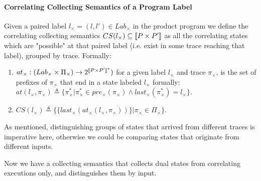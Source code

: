 \paragraph{Correlating Collecting Semantics of a Program Label} 
Given a paired label $l_{\times} = (l,l') \in Lab_{\times}$ in the product program we define the correlating collecting semantics $CS(l_{\times}) \subseteq \lbrack\!\lbrack P \times P' \rbrack\!\rbrack$ as all the correlating states which are "possible" at that paired label (i.e. exist in some trace reaching that label), grouped by trace. Formally:
\begin{enumerate}
\item $at_{\times} : (Lab_{\times} \times \Pi_{\times}) \rightarrow 2^{\lbrack\!\lbrack P \times P' \rbrack\!\rbrack^*})$ for a given label $l_{\times}$ and trace $\pi_{\times}$, is the set of prefixes of $\pi_{\times}$ that end in a state labeled $l_{\times}$ formally: $at(l_{\times},\pi_{\times}) \triangleq \{\pi_{\times}^* | \pi_{\times}^* \in pre_{\times}(\pi_{\times}) \wedge last_{\times}(\pi_{\times}^*)=l_{\times} \}$.
\item $CS(l_{\times}) \triangleq \{\{last_{\times}(at_{\times}(l_{\times},\pi_{\times}))\} | \pi_{\times} \in \Pi_{\times}\}$.
\end{enumerate}
As mentioned, distinguishing groups of states that arrived from different traces is imperative here, otherwise we could be comparing states that originate from different inputs.

Now we have a collecting semantics that collects dual states from correlating executions only, and distinguishes them by input.

